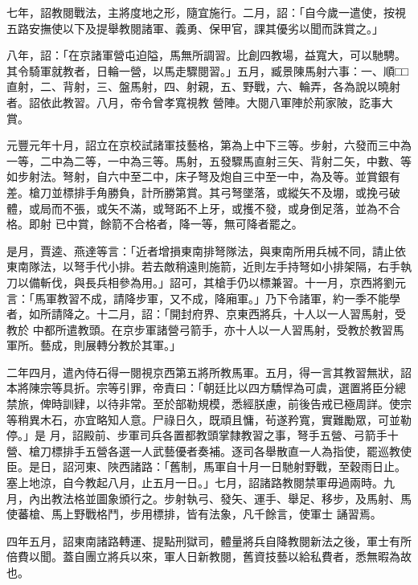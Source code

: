 \begin{pinyinscope}
 七年，詔教閱戰法，主將度地之形，隨宜施行。二月，詔：「自今歲一遣使，按視五路安撫使以下及提舉教閱諸軍、義勇、保甲官，課其優劣以聞而誅賞之。」



 八年，詔：「在京諸軍營屯迫隘，馬無所調習。比創四教場，益寬大，可以馳騁。其令騎軍就教者，日輪一營，以馬走驟閱習。」五月，臧景陳馬射六事：一、順□□直射，二、背射，三、盤馬射，四、射親，五、野戰，六、輪弄，各為說以曉射者。詔依此教習。八月，帝令曾孝寬視教
 營陣。大閱八軍陣於荊家陂，訖事大賞。



 元豐元年十月，詔立在京校試諸軍技藝格，第為上中下三等。步射，六發而三中為一等，二中為二等，一中為三等。馬射，五發驟馬直射三矢、背射二矢，中數、等如步射法。弩射，自六中至二中，床子弩及炮自三中至一中，為及等。並賞銀有差。槍刀並標排手角勝負，計所勝第賞。其弓弩墜落，或縱矢不及堋，或挽弓破體，或局而不張，或矢不滿，或弩跖不上牙，或擭不發，或身倒足落，並為不合格。即射
 已中賞，餘箭不合格者，降一等，無可降者罷之。



 是月，賈逵、燕達等言：「近者增損東南排弩隊法，與東南所用兵械不同，請止依東南隊法，以弩手代小排。若去敵稍遠則施箭，近則左手持弩如小排架隔，右手執刀以備斬伐，與長兵相參為用。」詔可，其槍手仍以標兼習。十一月，京西將劉元言：「馬軍教習不成，請降步軍，又不成，降廂軍。」乃下令諸軍，約一季不能學者，如所請降之。十二月，詔：「開封府界、京東西將兵，十人以一人習馬射，受教於
 中都所遣教頭。在京步軍諸營弓箭手，亦十人以一人習馬射，受教於教習馬軍所。藝成，則展轉分教於其軍。」



 二年四月，遣內侍石得一閱視京西第五將所教馬軍。五月，得一言其教習無狀，詔本將陳宗等具折。宗等引罪，帝責曰：「朝廷比以四方驕悍為可虞，選置將臣分總禁旅，俾時訓肄，以待非常。至於部勒規模，悉經朕慮，前後告戒已極周詳。使宗等稍異木石，亦宜略知人意。尸祿日久，既頑且慵，茍遂矜寬，實難勵眾，可並勒停。」是
 月，詔殿前、步軍司兵各置都教頭掌隸教習之事，弩手五營、弓箭手十營、槍刀標排手五營各選一人武藝優者奏補。逐司各舉散直一人為指使，罷巡教使臣。是日，詔河東、陜西諸路：「舊制，馬軍自十月一日馳射野戰，至穀雨日止。塞上地涼，自今教起八月，止五月一日。」七月，詔諸路教閱禁軍毋過兩時。九月，內出教法格並圖象頒行之。步射執弓、發矢、運手、舉足、移步，及馬射、馬使蕃槍、馬上野戰格鬥，步用標排，皆有法象，凡千餘言，使軍士
 誦習焉。



 四年五月，詔東南諸路轉運、提點刑獄司，體量將兵自降教閱新法之後，軍士有所倍費以聞。蓋自團立將兵以來，軍人日新教閱，舊資技藝以給私費者，悉無暇為故也。




\end{pinyinscope}
